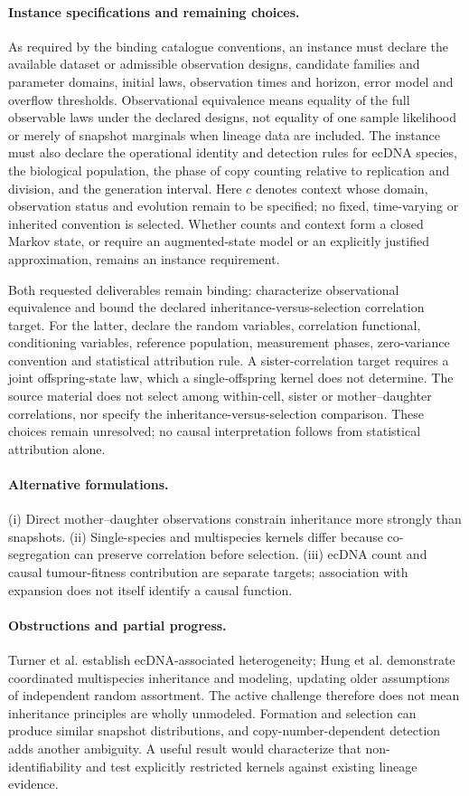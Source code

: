 \documentclass[11pt]{article}
\begin{document}
\paragraph{Instance specifications and remaining choices.} As required by the binding catalogue conventions, an instance must declare the available dataset or admissible observation designs, candidate families and parameter domains, initial laws, observation times and horizon, error model and overflow thresholds. Observational equivalence means equality of the full observable laws under the declared designs, not equality of one sample likelihood or merely of snapshot marginals when lineage data are included. The instance must also declare the operational identity and detection rules for ecDNA species, the biological population, the phase of copy counting relative to replication and division, and the generation interval. Here $c$ denotes context whose domain, observation status and evolution remain to be specified; no fixed, time-varying or inherited convention is selected. Whether counts and context form a closed Markov state, or require an augmented-state model or an explicitly justified approximation, remains an instance requirement.

Both requested deliverables remain binding: characterize observational equivalence and bound the declared inheritance-versus-selection correlation target. For the latter, declare the random variables, correlation functional, conditioning variables, reference population, measurement phases, zero-variance convention and statistical attribution rule. A sister-correlation target requires a joint offspring-state law, which a single-offspring kernel does not determine. The source material does not select among within-cell, sister or mother--daughter correlations, nor specify the inheritance-versus-selection comparison. These choices remain unresolved; no causal interpretation follows from statistical attribution alone.

\paragraph{Alternative formulations.} (i) Direct mother--daughter observations constrain inheritance more strongly than snapshots. (ii) Single-species and multispecies kernels differ because co-segregation can preserve correlation before selection. (iii) ecDNA count and causal tumour-fitness contribution are separate targets; association with expansion does not itself identify a causal function.
\paragraph{Obstructions and partial progress.} Turner et al. establish ecDNA-associated heterogeneity; Hung et al. demonstrate coordinated multispecies inheritance and modeling, updating older assumptions of independent random assortment. The active challenge therefore does not mean inheritance principles are wholly unmodeled. Formation and selection can produce similar snapshot distributions, and copy-number-dependent detection adds another ambiguity. A useful result would characterize that non-identifiability and test explicitly restricted kernels against existing lineage evidence.
\end{document}
